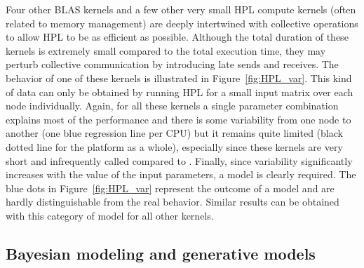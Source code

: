             Four other BLAS kernels and a few other very small HPL compute kernels (often related to memory management)
            are deeply intertwined with collective operations to allow HPL to be as efficient as possible. Although the
            total duration of these kernels is extremely small compared to the total execution time, they may perturb
            collective communication by introducing late sends and receives. The behavior of one of these kernels is
            illustrated in Figure~\ref{fig:HPL_var}. This kind of data can only be obtained by running HPL for a small
            input matrix over each node individually. Again, for all these kernels a single parameter combination
            explains most of the performance and there is some variability from one node to another (one blue regression
            line per CPU) but it remains quite limited (black dotted line for the platform as a whole), especially since
            these kernels are very short and infrequently called compared to \dgemm. Finally, since variability
            significantly increases with the value of the input parameters, a  model is clearly required. The
            blue dots in Figure~\ref{fig:HPL_var} represent the outcome of a  model and are hardly
            distinguishable from the real behavior. Similar results can be obtained with this category of model for all
            other kernels.

        \subsection{Bayesian modeling and generative models}%
        \label{sub:dgemm_model:generative_models}

